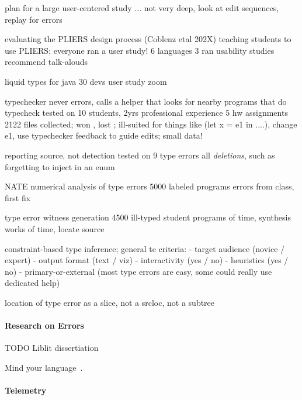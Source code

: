\documentclass[english,submission,cleveref]{programming}
\begin{document}
\cite{t-hatra-2021}
plan for a large user-centered study 
... not very deep, look at edit sequences, replay for errors


\cite{cdhhjklwya-hatra-2020}
evaluating the PLIERS design process (Coblenz etal 202X)
teaching students to use PLIERS; everyone ran a user study!
6 languages
 3 ran usability studies
recommend talk-alouds


\cite{gstf-hatra-2021}
liquid types for java
30 devs user study
 zoom

\cite{lfgc-pldi-2007}
typechecker never errors,
 calls a helper that looks for nearby programs that do typecheck
tested on
 10 students, 2yrs professional experience
 5 hw assignments
 2122 files collected;
won , lost ;
ill-suited for things like (let x = e1 in ....),
 change e1,
 use typechecker feedback to guide edits;
small data!


\cite{w-popl-1986}
reporting source, not detection
tested on 9 type errors
 all \emph{deletions}, such as forgetting to inject in an enum

\cite{sscwj-oopsla-2017}
NATE numerical analysis of type errors
5000 labeled programs
 errors from class, first fix


\cite{sjw-jfp-2018}
type error witness generation
4500 ill-typed student programs
  of time, synthesis works
  of time, locate source


\cite{h-dissertiation-2005}
constraint-based type inference;
general te criteria:
- target audience (novice / expert)
- output format (text / viz)
- interactivity (yes / no)
- heuristics (yes / no)
- primary-or-external (most type errors are easy, some could really use dedicated help)


\cite{hw-scp-2004}
location of type error as a slice,
 not a srcloc,
 not a subtree



\paragraph{Research on Errors}

TODO Liblit dissertiation

Mind your language~\cite{mfk-onward-2011}.


\paragraph{Telemetry}
\end{document}
